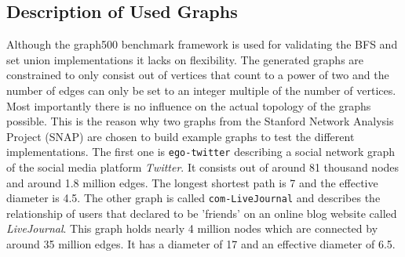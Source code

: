 \subsection{Description of Used Graphs} \label{sec:usedGraphs}
Although the graph500 \cite{graph500} benchmark framework is used for validating the BFS and set union implementations it lacks on flexibility. The generated graphs are constrained to only consist out of vertices that count to a power of two and the number of edges can only be set to an integer multiple of the number of vertices. Most importantly there is no influence on the actual topology of the graphs possible. This is the reason why two graphs from the Stanford Network Analysis Project (SNAP) \cite{snapnets} are chosen to build example graphs to test the different implementations. The first one is \texttt{ego-twitter} describing a social network graph of the social media platform \textit{Twitter}. It consists out of around 81 thousand nodes and around 1.8 million edges. The longest shortest path is 7 and the effective diameter is 4.5. The other graph is called \texttt{com-LiveJournal} and describes the relationship of users that declared to be 'friends' on an online blog website called \textit{LiveJournal}. This graph holds nearly 4 million nodes which are connected by around 35 million edges. It has a diameter of 17 and an effective diameter of 6.5.

